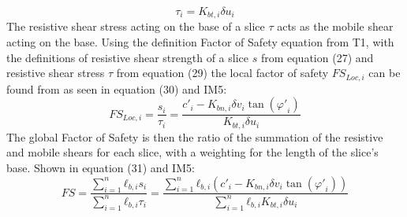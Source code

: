 \documentclass[12pt]{article}
\begin{document}
\begin{dmath}
τ_{i}={K_{bt,i}} {δu}_{i}
\end{dmath}
The resistive shear stress acting on the base of a slice $τ$ acts as the mobile shear acting on the base. Using the definition Factor of Safety equation from T1, with the definitions of resistive shear strength of a slice $s$ from equation (27) and resistive shear stress $τ$ from equation (29) the local factor of safety ${FS_{Loc,i}}$ can be found from as seen in equation (30) and IM5:
\begin{dmath}
{FS_{Loc,i}}=\frac{s_{i}}{τ_{i}}=\frac{{c'}_{i}-{K_{bn,i}} {δv}_{i} \tan\left({φ'}_{i}\right)}{{K_{bt,i}} {δu}_{i}}
\end{dmath}
The global Factor of Safety is then the ratio of the summation of the resistive and mobile shears for each slice, with a weighting for the length of the slice's base. Shown in equation (31) and IM5:
\begin{dmath}
FS=\frac{\displaystyle\sum_{i=1}^{n}{{ℓ_{b,i}} s_{i}}}{\displaystyle\sum_{i=1}^{n}{{ℓ_{b,i}} τ_{i}}}=\frac{\displaystyle\sum_{i=1}^{n}{{ℓ_{b,i}} \left({c'}_{i}-{K_{bn,i}} {δv}_{i} \tan\left({φ'}_{i}\right)\right)}}{\displaystyle\sum_{i=1}^{n}{{ℓ_{b,i}} {K_{bt,i}} {δu}_{i}}}
\end{dmath}
~\newline
\end{document}

